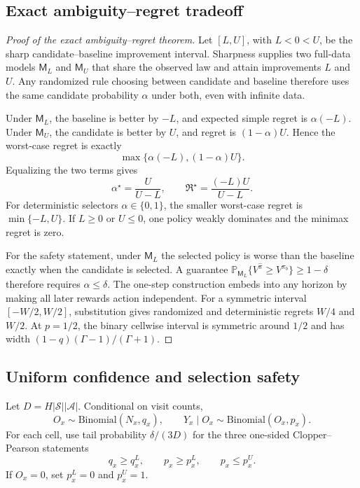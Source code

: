 \documentclass[letterpaper]{article}
\newcommand{\Prb}{\mathbb{P}}
\newcommand{\cS}{\mathcal{S}}
\newcommand{\cA}{\mathcal{A}}
\begin{document}
\subsection{Exact ambiguity--regret tradeoff}
\begin{proof}[Proof of the exact ambiguity--regret theorem]
Let $[L,U]$, with $L<0<U$, be the sharp candidate--baseline improvement interval. Sharpness supplies two full-data models $\mathsf M_L$ and $\mathsf M_U$ that share the observed law and attain improvements $L$ and $U$. Any randomized rule choosing between candidate and baseline therefore uses the same candidate probability $\alpha$ under both, even with infinite data.

Under $\mathsf M_L$, the baseline is better by $-L$, and expected simple regret is $\alpha(-L)$. Under $\mathsf M_U$, the candidate is better by $U$, and regret is $(1-\alpha)U$. Hence the worst-case regret is exactly
\[
\max\{\alpha(-L),(1-\alpha)U\}.
\]
Equalizing the two terms gives
\[
\alpha^\star=\frac{U}{U-L},
\qquad
\mathfrak R^\star=\frac{(-L)U}{U-L}.
\]
For deterministic selectors $\alpha\in\{0,1\}$, the smaller worst-case regret is $\min\{-L,U\}$. If $L\geq0$ or $U\leq0$, one policy weakly dominates and the minimax regret is zero.

For the safety statement, under $\mathsf M_L$ the selected policy is worse than the baseline exactly when the candidate is selected. A guarantee
$\Prb_{\mathsf M_L}\{V^{\widehat\pi}\geq V^{\pi_b}\}\geq1-\delta$
therefore requires $\alpha\leq\delta$. The one-step construction embeds into any horizon by making all later rewards action independent. For a symmetric interval $[-W/2,W/2]$, substitution gives randomized and deterministic regrets $W/4$ and $W/2$. At $p=1/2$, the binary cellwise interval is symmetric around $1/2$ and has width $(1-q)(\Gamma-1)/(\Gamma+1)$.
\end{proof}

\subsection{Uniform confidence and selection safety}
Let $D=H|\cS||\cA|$. Conditional on visit counts,
\[
O_x\sim\mathrm{Binomial}(N_x,q_x),\qquad
Y_x\mid O_x\sim\mathrm{Binomial}(O_x,p_x).
\]
For each cell, use tail probability $\delta/(3D)$ for the three one-sided Clopper--Pearson statements
\[
q_x\geq q_x^L,\qquad p_x\geq p_x^L,\qquad p_x\leq p_x^U.
\]
If $O_x=0$, set $p_x^L=0$ and $p_x^U=1$.
\end{document}
